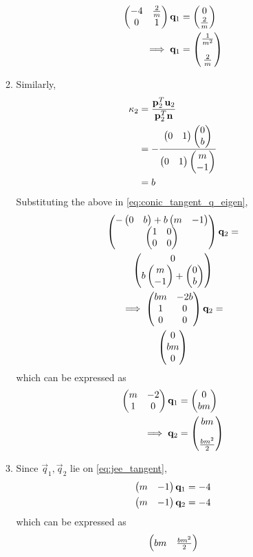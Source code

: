 \documentclass[journal,12pt,twocolumn]{IEEEtran}
\renewcommand\thesection{\arabic{section}}
\begin{document}
\begin{enumerate}[label=\thesection.\arabic*.,ref=\thesection.\theenumi]
\begin{enumerate}
\begin{align}
\begin{pmatrix}
	-4 & \frac{2}{m}  \\  0 &  1
\end{pmatrix}
\mathbf{q}_1 &= 
\begin{pmatrix}
	0
\\
\frac{2}{m}
\end{pmatrix}
\\
\implies \mathbf{q}_1 &=\begin{pmatrix}
\frac{1}{m^2}	
\\[1em]
\frac{2}{m}
\end{pmatrix}
\end{align}
\item Similarly, 
\begin{align}
	\kappa_2 &= \frac{\mathbf{p}_2^T\mathbf{u}_2}{\mathbf{p}_2^T\mathbf{n}}
	\\
	&= -\frac{\begin{pmatrix}0 & 1\end{pmatrix} \begin{pmatrix}0 \\ b\end{pmatrix}}{\begin{pmatrix}0 & 1\end{pmatrix}\begin{pmatrix}m \\ -1\end{pmatrix}}
	\\
	&= b
\end{align}
Substituting the above in 
\eqref{eq:conic_tangent_q_eigen},
\begin{multline}
	\begin{pmatrix}
		{-\ensuremath{\begin{pmatrix}0 & b\end{pmatrix}}+b \ensuremath{\begin{pmatrix}m & -1\end{pmatrix}}} \\ \begin{pmatrix}1 & 0 \\ 0 &  0\end{pmatrix} 
\end{pmatrix}
\mathbf{q}_2 = 
\\
	\begin{pmatrix}
		0
\\
b \begin{pmatrix}m \\ -1\end{pmatrix}+\begin{pmatrix}0 \\ b\end{pmatrix}
	\end{pmatrix}
	\\
\implies 
\begin{pmatrix}
	bm & -2b \\ 1 & 0 \\ 0 &  0
\end{pmatrix}
\mathbf{q}_2 = 
\\
\begin{pmatrix}
	0
\\
bm
\\
0
\end{pmatrix}
\end{multline}
which can be expressed  as 
\begin{align}
\begin{pmatrix}
	m & -2  \\  1 &  0
\end{pmatrix}
\mathbf{q}_1 &= 
\begin{pmatrix}
	0
\\
bm
\end{pmatrix}
\\
\implies \mathbf{q}_2 &=\begin{pmatrix}
	bm
\\[1em]
\frac{bm^2}{2}
\end{pmatrix}
\end{align}
\item Since $\vec{q}_1, \vec{q}_2$ lie on 
	\eqref{eq:jee_tangent}, 
\begin{align}
	\begin{pmatrix}m & -1\end{pmatrix}\mathbf{q}_1&= -4
	\\
	\begin{pmatrix}m & -1\end{pmatrix}\mathbf{q}_2&= -4
\end{align}
which can be expressed as 
\begin{align}
	\begin{pmatrix}bm & \frac{bm^2}{2} 
	\\
\end{pmatrix}
\end{align}
\end{enumerate}
\end{enumerate}
\end{document}
